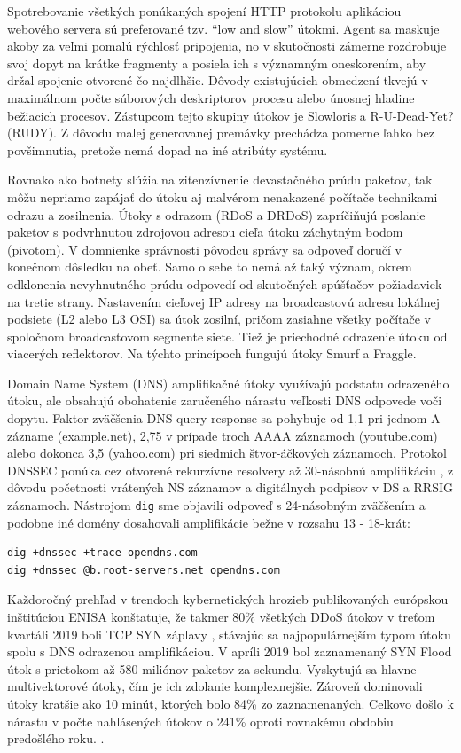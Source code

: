 \documentclass[12pt, a4paper]{article}
\begin{document}
Spotrebovanie všetkých ponúkaných spojení HTTP protokolu aplikáciou webového servera sú preferované
tzv. \enquote{low and slow} útokmi. Agent sa maskuje akoby za veľmi pomalú rýchlosť pripojenia,
no v skutočnosti zámerne rozdrobuje svoj dopyt na krátke fragmenty a posiela ich s významným oneskorením,
aby držal spojenie otvorené čo najdlhšie. Dôvody existujúcich obmedzení tkvejú v maximálnom počte 
súborových deskriptorov procesu alebo únosnej hladine bežiacich procesov. Zástupcom tejto skupiny
útokov je Slowloris a R-U-Dead-Yet? (RUDY). Z dôvodu malej generovanej premávky prechádza pomerne ľahko 
bez povšimnutia, pretože nemá dopad na iné atribúty systému.

Rovnako ako botnety slúžia na zitenzívnenie devastačného prúdu paketov, tak môžu nepriamo zapájať 
do útoku aj malvérom nenakazené počítače technikami odrazu a zosilnenia. Útoky s odrazom (RDoS a DRDoS) 
zapríčiňujú poslanie paketov s podvrhnutou zdrojovou adresou cieľa útoku záchytným bodom (pivotom).
V domnienke správnosti pôvodcu správy sa odpoveď doručí v konečnom dôsledku na obeť. Samo o sebe to nemá až 
taký význam, okrem odklonenia nevyhnutného prúdu odpovedí od skutočných spúšťačov požiadaviek na tretie
strany. Nastavením cieľovej IP adresy na broadcastovú adresu lokálnej podsiete (L2 alebo L3 OSI) sa
útok zosilní, pričom zasiahne všetky počítače v spoločnom broadcastovom segmente siete. Tiež je priechodné 
odrazenie útoku od viacerých reflektorov. Na týchto princípoch fungujú útoky Smurf a Fraggle.

Domain Name System (DNS) amplifikačné útoky využívajú podstatu odrazeného útoku, ale obsahujú obohatenie
zaručeného nárastu veľkosti DNS odpovede voči dopytu. Faktor zväčšenia DNS query response sa pohybuje
od 1,1 pri jednom A zázname (example.net), 2,75 v prípade troch AAAA záznamoch (youtube.com) alebo 
dokonca 3,5 (yahoo.com) pri siedmich štvor-áčkových záznamoch. Protokol DNSSEC ponúka
cez otvorené rekurzívne resolvery až 30-násobnú amplifikáciu \cite{csirt-ddos}, 
z dôvodu početnosti vrátených NS záznamov a digitálnych podpisov v DS a RRSIG záznamoch. 
Nástrojom \verb|dig| sme objavili odpoveď s 24-násobným zväčšením a podobne iné domény dosahovali
amplifikácie bežne v rozsahu 13 - 18-krát:
\begin{lstlisting}
dig +dnssec +trace opendns.com
dig +dnssec @b.root-servers.net opendns.com
\end{lstlisting}

Každoročný prehľad v trendoch kybernetických hrozieb publikovaných európskou inštitúciou ENISA
konštatuje, že takmer 80\% všetkých DDoS útokov v treťom kvartáli 2019 boli TCP SYN záplavy 
\cite{enisa-ddos}, stávajúc sa najpopulárnejším typom útoku spolu s DNS odrazenou amplifikáciou. 
V apríli 2019 bol zaznamenaný SYN Flood útok s prietokom až 580 miliónov paketov za sekundu. Vyskytujú
sa hlavne multivektorové útoky, čím je ich zdolanie komplexnejšie. Zároveň dominovali útoky kratšie
ako 10 minút, ktorých bolo 84\% zo zaznamenaných. Celkovo došlo k nárastu v počte nahlásených útokov
o 241\% oproti rovnakému obdobiu predošlého roku. \cite{enisa-ddos}.
\end{document}
